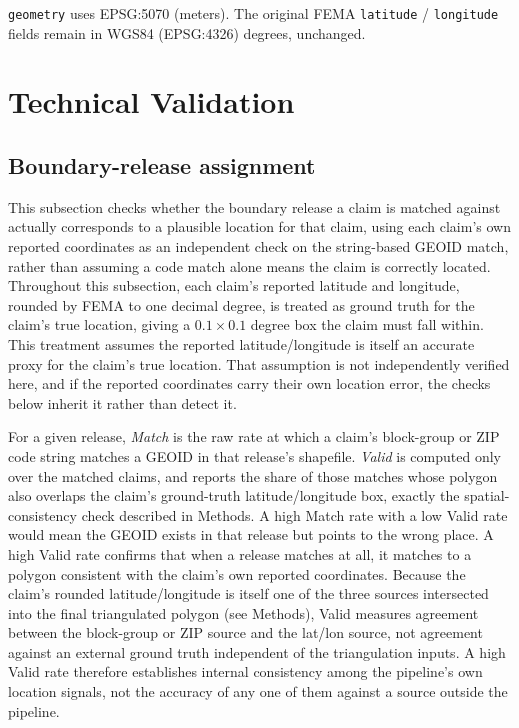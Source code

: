 \texttt{geometry} uses EPSG:5070 (meters). The original FEMA
\texttt{latitude} / \texttt{longitude} fields remain in WGS84
(EPSG:4326) degrees, unchanged.

\section*{Technical Validation}

\subsection*{Boundary-release assignment}

This subsection checks whether the boundary release a claim is matched
against actually corresponds to a plausible location for that claim,
using each claim's own reported coordinates as an independent check on
the string-based GEOID match, rather than assuming a code match alone
means the claim is correctly located. Throughout this subsection, each claim's reported latitude and
longitude, rounded by FEMA to one decimal degree, is treated as ground
truth for the claim's true location, giving a $0.1 \times 0.1$ degree
box the claim must fall within. This treatment assumes the reported
latitude/longitude is itself an accurate proxy for the claim's true
location. That assumption is not independently verified here, and if
the reported coordinates carry their own location error, the checks
below inherit it rather than detect it.

For a given release, \emph{Match} is the raw rate at which a claim's block-group or ZIP code string matches a GEOID
in that release's shapefile. \emph{Valid} is computed only over the matched
claims, and reports the share of those matches whose polygon also
overlaps the claim's ground-truth latitude/longitude box, exactly the
spatial-consistency check described in Methods. A high Match rate with
a low Valid rate would mean the GEOID exists in that release but points
to the wrong place. A high Valid rate confirms that when a release
matches at all, it matches to a polygon consistent with the claim's
own reported coordinates. Because the claim's rounded latitude/longitude
is itself one of the three sources intersected into the final
triangulated polygon (see Methods), Valid measures agreement between
the block-group or ZIP source and the lat/lon source, not agreement
against an external ground truth independent of the triangulation
inputs. A high Valid rate therefore establishes internal consistency
among the pipeline's own location signals, not the accuracy of any one
of them against a source outside the pipeline.

